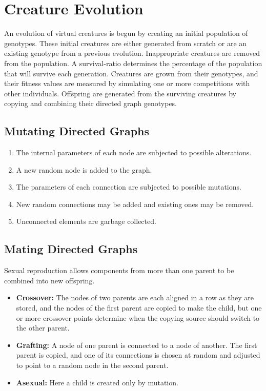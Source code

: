 \documentclass[../main.tex]{subfiles}
\begin{document}
\section{Creature Evolution}

An evolution of virtual creatures is begun by creating an initial population of genotypes. These initial creatures are
either generated from scratch or are an existing genotype from a previous evolution.  Inappropriate creatures are
removed from the population. A survival-ratio determines the percentage of the population that will survive each
generation. Creatures are grown from their genotypes, and their fitness values are measured by simulating one or more
competitions with other individuals. Offspring are generated from the surviving creatures by copying and combining
their directed graph genotypes.

\subsection{Mutating Directed Graphs}

\begin{enumerate}
	\item The internal parameters of each node are subjected to possible alterations.
	\item A new random node is added to the graph.
	\item The parameters of each connection are subjected to possible mutations.
	\item New random connections may be added and existing ones may be removed.
	\item Unconnected elements are garbage collected.
\end{enumerate}

\subsection{Mating Directed Graphs}

Sexual reproduction allows components from more than one parent to be combined into new offspring.

\begin{itemize}
	\item \textbf{Crossover:} The nodes of two parents are each aligned in a row as they are stored, and the nodes of
	the first parent are copied to make the child, but one or more crossover points determine when the copying source
	should switch to the other parent.
	\item \textbf{Grafting:} A node of one parent is connected to a node of another.  The first parent is copied, and
	one of its connections is chosen at random and adjusted to point to a random node in the second parent.
	\item \textbf{Asexual:} Here a child is created only by mutation.
\end{itemize}
\end{document}
